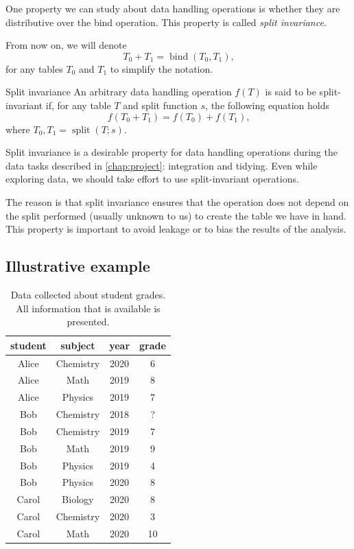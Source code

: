 One property we can study about data handling operations is whether they are distributive
over the bind operation.  This property is called \emph{split invariance}.

From now on, we will denote \[
  T_0 + T_1 = \operatorname{bind}(T_0, T_1)\text{,}
\] for any tables $T_0$ and $T_1$ to simplify the notation.

\begin{definition}{Split invariance}\label{def:split-invariance}
An arbitrary data handling operation $f(T)$ is said to be split-invariant
if, for any table $T$ and split function $s$, the following equation holds \[
  f\!\left(T_0 + T_1\right) =
    f\!\left(T_0\right) + f\!\left(T_1\right)\text{,}
\] where $T_0, T_1 = \operatorname{split}\!\left(T; s\right)$.
\end{definition}

Split invariance is a desirable property for data handling operations during the data
tasks described in \cref{chap:project}: integration and tidying.  Even while exploring
data, we should take effort to use split-invariant operations.

The reason is that split invariance ensures that the operation does not depend on the
split performed (usually unknown to us) to create the table we have in hand.  This
property is important to avoid \gls{leakage} or to bias the results of the analysis.

\subsection{Illustrative example}

\begin{table}
  \centering
  \begin{tabular}{cccc}
    \toprule
    \textbf{student} & \textbf{subject} & \textbf{year} & \textbf{grade} \\
    \midrule
    Alice & Chemistry & 2020 & 6 \\
    Alice & Math & 2019 & 8 \\
    Alice & Physics & 2019 & 7 \\
    Bob & Chemistry & 2018 & ? \\
    Bob & Chemistry & 2019 & 7 \\
    Bob & Math & 2019 & 9 \\
    Bob & Physics & 2019 & 4 \\
    Bob & Physics & 2020 & 8 \\
    Carol & Biology & 2020 & 8 \\
    Carol & Chemistry & 2020 & 3 \\
    Carol & Math & 2020 & 10 \\
    \bottomrule
  \end{tabular}
  \caption{
  Data collected about student grades.  All information that is available is presented.
  }
  \label{tab:grades1}
\end{table}


